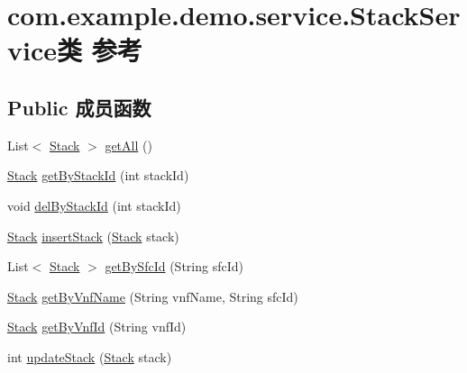 \hypertarget{classcom_1_1example_1_1demo_1_1service_1_1_stack_service}{}\section{com.\+example.\+demo.\+service.\+Stack\+Service类 参考}
\label{classcom_1_1example_1_1demo_1_1service_1_1_stack_service}
\subsection*{Public 成员函数}
\begin{DoxyCompactItemize}
\item 
List$<$ \mbox{\hyperlink{classcom_1_1example_1_1demo_1_1modular_1_1_stack}{Stack}} $>$ \mbox{\hyperlink{classcom_1_1example_1_1demo_1_1service_1_1_stack_service_ab462cc3fe149b8ef43f00cee39aad991}{get\+All}} ()
\item 
\mbox{\hyperlink{classcom_1_1example_1_1demo_1_1modular_1_1_stack}{Stack}} \mbox{\hyperlink{classcom_1_1example_1_1demo_1_1service_1_1_stack_service_a1ce21af1beb27311260cebe917d731d9}{get\+By\+Stack\+Id}} (int stack\+Id)
\item 
void \mbox{\hyperlink{classcom_1_1example_1_1demo_1_1service_1_1_stack_service_a08d273dd7cbd010914079cf9ef8e53c8}{del\+By\+Stack\+Id}} (int stack\+Id)
\item 
\mbox{\hyperlink{classcom_1_1example_1_1demo_1_1modular_1_1_stack}{Stack}} \mbox{\hyperlink{classcom_1_1example_1_1demo_1_1service_1_1_stack_service_ab4ee52412332a907d899951c21c87763}{insert\+Stack}} (\mbox{\hyperlink{classcom_1_1example_1_1demo_1_1modular_1_1_stack}{Stack}} stack)
\item 
List$<$ \mbox{\hyperlink{classcom_1_1example_1_1demo_1_1modular_1_1_stack}{Stack}} $>$ \mbox{\hyperlink{classcom_1_1example_1_1demo_1_1service_1_1_stack_service_afd7b39a1ba58d47136827110214e6325}{get\+By\+Sfc\+Id}} (String sfc\+Id)
\item 
\mbox{\hyperlink{classcom_1_1example_1_1demo_1_1modular_1_1_stack}{Stack}} \mbox{\hyperlink{classcom_1_1example_1_1demo_1_1service_1_1_stack_service_ae8d285d2c823fd82bdaf9d33b2bb2f10}{get\+By\+Vnf\+Name}} (String vnf\+Name, String sfc\+Id)
\item 
\mbox{\hyperlink{classcom_1_1example_1_1demo_1_1modular_1_1_stack}{Stack}} \mbox{\hyperlink{classcom_1_1example_1_1demo_1_1service_1_1_stack_service_a33c6aa0c7dd6bfa2145f0ffc8d78482f}{get\+By\+Vnf\+Id}} (String vnf\+Id)
\item 
int \mbox{\hyperlink{classcom_1_1example_1_1demo_1_1service_1_1_stack_service_ad20a6ebe027189ce0a0ec779911bb962}{update\+Stack}} (\mbox{\hyperlink{classcom_1_1example_1_1demo_1_1modular_1_1_stack}{Stack}} stack)
\end{DoxyCompactItemize}
